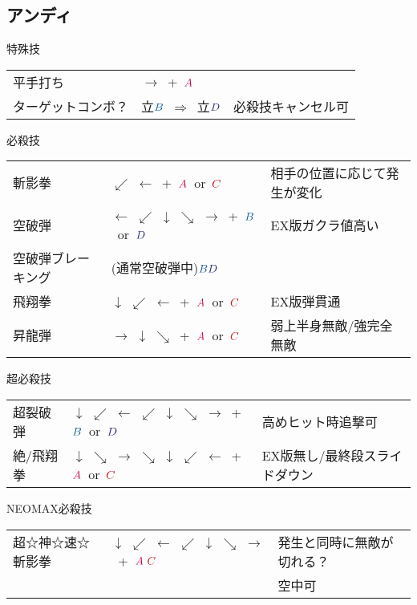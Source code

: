 \documentclass[a4j,11pt]{jarticle}
\def\A{\textcolor{Acolor}{A}}
\def\C{\textcolor{Ccolor}{C}}
\def\B{\textcolor{Bcolor}{B}}
\def\D{\textcolor{Dcolor}{D}}
\def\tatsu{$\downarrow$ $\swarrow$ $\leftarrow$}%
\def\syoryu{$\rightarrow$ $\downarrow$ $\searrow$}%
\def\yoga{$\leftarrow$ $\swarrow$ $\downarrow$ $\searrow$ $\rightarrow$}%
\def\ryuko{$\downarrow$ $\searrow$ $\rightarrow$ $\searrow$ $\downarrow$ $\swarrow$ $\leftarrow$}%
\def\orochi{$\downarrow$ $\swarrow$ $\leftarrow$ $\swarrow$ $\downarrow$ $\searrow$ $\rightarrow$}%
\def\Cancel{$\Longrightarrow$}
\begin{document}
\subsection{アンディ}
\begin{itembox}[l]{特殊技}
\begin{tabular}{lll}
平手打ち&$\rightarrow$\ +\ $\A$&\\
ターゲットコンボ？&立$\B$\ \Cancel\ 立$\D$&必殺技キャンセル可
\end{tabular}
\end{itembox}
\begin{itembox}[l]{必殺技}
\begin{tabular}{lll}
斬影拳&$\swarrow$ $\leftarrow$\ +\ $\A$\ or\ $\C$&相手の位置に応じて発生が変化\\
空破弾&\yoga\ +\ $\B$\ or\ $\D$&EX版ガクラ値高い\\
空破弾ブレーキング&(通常空破弾中)$\B \D$&\\
飛翔拳&\tatsu\ +\ $\A$\ or\ $\C$&EX版弾貫通\\
昇龍弾&\syoryu\ +\ $\A$\ or\ $\C$&弱上半身無敵/強完全無敵
\end{tabular}
\end{itembox}
\begin{itembox}[l]{超必殺技}
\begin{tabular}{lll}
超裂破弾&\orochi\ +\ $\B$\ or\ $\D$&高めヒット時追撃可\\
絶/飛翔拳&\ryuko\ +\ $\A$\ or\ $\C$&EX版無し/最終段スライドダウン
\end{tabular}
\end{itembox}

\begin{itembox}[l]{NEOMAX必殺技}
\begin{tabular}{lll}
超☆神☆速☆斬影拳&\orochi\ +\ $\A\ \C$&発生と同時に無敵が切れる？\\
&&空中可
\end{tabular}
\end{itembox}
\newpage
\end{document}
